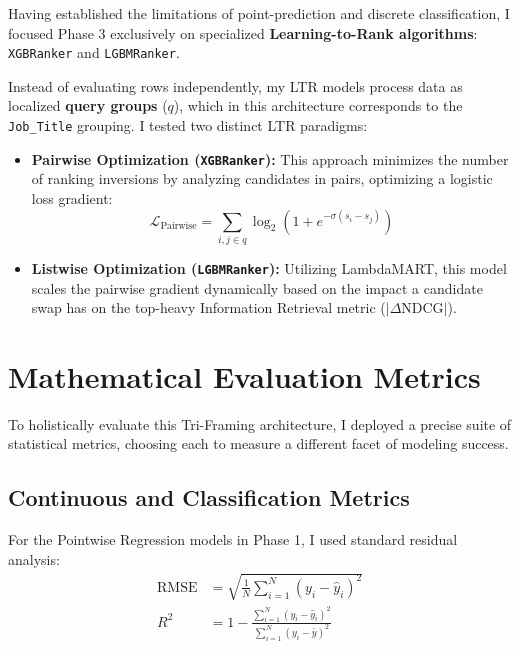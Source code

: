 Having established the limitations of point-prediction and discrete classification, I focused Phase 3 exclusively on specialized \textbf{Learning-to-Rank algorithms}: \texttt{XGBRanker} and \texttt{LGBMRanker}.

Instead of evaluating rows independently, my LTR models process data as localized \textbf{query groups} ($q$), which in this architecture corresponds to the \texttt{Job\_Title} grouping. I tested two distinct LTR paradigms:
\begin{itemize}
    \item \textbf{Pairwise Optimization (\texttt{XGBRanker}):} This approach minimizes the number of ranking inversions by analyzing candidates in pairs, optimizing a logistic loss gradient:
    \begin{equation}
    \mathcal{L}_{\text{Pairwise}} = \sum_{i,j \in q} \log_2\!\left(1 + e^{-\sigma(s_i - s_j)}\right)
    \label{eq:eval_pairwise_loss}
    \end{equation}
    \item \textbf{Listwise Optimization (\texttt{LGBMRanker}):} Utilizing LambdaMART, this model scales the pairwise gradient dynamically based on the impact a candidate swap has on the top-heavy Information Retrieval metric ($|\Delta \text{NDCG}|$).
\end{itemize}

\section{Mathematical Evaluation Metrics}
\label{sec:eval_metrics}

To holistically evaluate this Tri-Framing architecture, I deployed a precise suite of statistical metrics, choosing each to measure a different facet of modeling success.

\subsection{Continuous and Classification Metrics}

For the Pointwise Regression models in Phase 1, I used standard residual analysis:
\begin{align}
\text{RMSE} &= \sqrt{\frac{1}{N}\sum_{i=1}^{N}(y_i - \hat{y}_i)^2} \label{eq:eval_rmse} \\
R^2 &= 1 - \frac{\sum_{i=1}^{N}(y_i - \hat{y}_i)^2}{\sum_{i=1}^{N}(y_i - \bar{y})^2} \label{eq:eval_r2}
\end{align}

